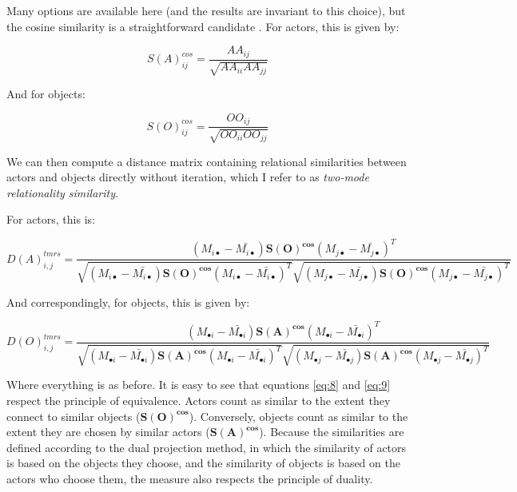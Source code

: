 \documentclass[a4paper,fleqn]{cas-sc}
\begin{document}
Many options are available here (and the results are invariant to this choice), but the cosine similarity is a straightforward candidate \citep[422]{goodman1996single}. For actors, this is given by:

\begin{equation}
    S(A)^{cos}_{ij} = \frac{AA_{ij}}{\sqrt{AA_{ii}AA_{jj}}}
    \label{eq:6}
\end{equation}

And for objects:

\begin{equation}
    S(O)^{cos}_{ij} = \frac{OO_{ij}}{\sqrt{OO_{ii}OO_{jj}}}
    \label{eq:7}
\end{equation}

We can then compute a distance matrix containing relational similarities between actors and objects directly without iteration, which I refer to as \textit{two-mode relationality similarity}. 

For actors, this is:

\begin{equation}
    D(A)^{tmrs}_{i,j} = 
    \frac{
    (M_{i\bullet} - \bar{M_{i\bullet}})
    \mathbf{S(O)^{cos}}
    (M_{j\bullet} - \bar{M_{j\bullet}})^T
    }
    {
    \sqrt{
    (M_{i\bullet} - \bar{M_{i\bullet}})
    \mathbf{S(O)^{cos}}
    (M_{i\bullet} - \bar{M_{i\bullet}})^T
    }
    \sqrt{
    (M_{j\bullet} - \bar{M_{j\bullet}})
    \mathbf{S(O)^{cos}}
    (M_{j\bullet} - \bar{M_{j\bullet}})^T
        }
    }
    \label{eq:8}
\end{equation}

And correspondingly, for objects, this is given by:

\begin{equation}
    D(O)^{tmrs}_{i,j} = 
    \frac{
    (M_{\bullet i} - \bar{M_{\bullet i}})
    \mathbf{S(A)^{cos}}
    (M_{\bullet i} - \bar{M_{\bullet i}})^T
    }
    {
    \sqrt{
    (M_{\bullet i} - \bar{M_{\bullet i}})
    \mathbf{S(A)^{cos}}
    (M_{\bullet i} - \bar{M_{\bullet i}})^T
    }
    \sqrt{
    (M_{\bullet j} - \bar{M_{\bullet j}})
    \mathbf{S(A)^{cos}}
    (M_{\bullet j} - \bar{M_{\bullet j}})^T
        }
    }
    \label{eq:9}
\end{equation}

Where everything is as before. It is easy to see that equations \ref{eq:8} and \ref{eq:9} respect the principle of equivalence. Actors count as similar to the extent they connect to similar objects ($\mathbf{S(O)^{cos}}$). Conversely, objects count as similar to the extent they are chosen by similar actors ($ \mathbf{S(A)^{cos}}$). Because the similarities are defined according to the dual projection method, in which the similarity of actors is based on the objects they choose, and the similarity of objects is based on the actors who choose them, the measure also respects the principle of duality.
\end{document}
